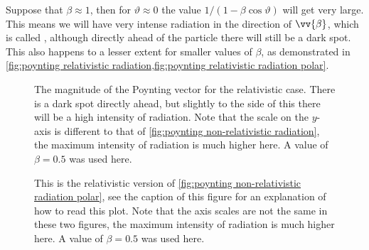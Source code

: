 \documentclass[fleqn]{NotesClass}
\begin{document}
    Suppose that \(\beta \approx 1\), then for \(\vartheta \approx 0\) the value \(1/(1 - \beta\cos\vartheta)\) will get very large.
    This means we will have very intense radiation in the direction of \(\vv{\beta}\), which is called , although directly ahead of the particle there will still be a dark spot.
    This also happens to a lesser extent for smaller values of \(\beta\), as demonstrated in \cref{fig:poynting relativistic radiation,fig:poynting relativistic radiation polar}.
    
    \begin{figure}
        \caption{The magnitude of the Poynting vector for the relativistic case. There is a dark spot directly ahead, but slightly to the side of this there will be a high intensity of radiation. Note that the scale on the \(y\)-axis is different to that of \cref{fig:poynting non-relativistic radiation}, the maximum intensity of radiation is much higher here. A value of \(\beta = 0.5\) was used here.}
        \label{fig:poynting relativistic radiation}
    \end{figure}
    \begin{figure}
        \caption[Polar plot of non-relativistic Poynting vector.]{This is the relativistic version of \cref{fig:poynting non-relativistic radiation polar}, see the caption of this figure for an explanation of how to read this plot. Note that the axis scales are not the same in these two figures, the maximum intensity of radiation is much higher here. A value of \(\beta = 0.5\) was used here.}
        \label{fig:poynting relativistic radiation polar}
    \end{figure}
    
    \backmatter
    \printindex
\end{document}
